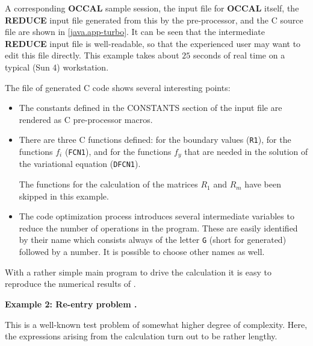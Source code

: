 \documentclass[12pt,a4paper]{article}
\newcommand{\OCCAL}{{\sf\bf OCCAL}}
\newcommand{\REDUCE}{{\sf\bf REDUCE}}
\newcommand{\C}{{\sf C}}
\begin{document}
A corresponding \OCCAL{} sample session, the input file for \OCCAL{}
itself, the \REDUCE{} input file generated from this by the
pre-processor, and the \C{} source file are shown in \ref{java.app-turbo}.
It can be seen that the intermediate \REDUCE{} input file is
well-readable, so that the experienced user may want to edit this file
directly. This example takes about $25$ seconds of real time on a
typical (Sun 4) workstation.

The file of generated \C{} code shows several interesting points:
\begin{itemize}
  \item The constants defined in the CONSTANTS section of the input
        file are rendered as \C{} pre-processor macros.

  \item There are three \C{} functions defined: for the boundary
        values (\verb|R1|), for the functions $f_{i}$ (\verb|FCN1|),
        and for the functions $f_{y}$ that are needed in the solution
        of the variational equation (\verb|DFCN1|).

        The functions for the calculation of the matrices $R_{1}$ and
        $R_{m}$ have been skipped in this example.
  \item The code optimization process introduces several intermediate
        variables to reduce the number of operations in the program.
        These are easily identified by their name which consists
        always of the letter \verb|G| (short for generated) followed
        by a number. It is possible to choose other names as well.
\end{itemize}

With a rather simple main program to drive the calculation it is easy
to reproduce the numerical results of \cite{Wulkow}.

\vspace*{3mm}

\noindent
{\bf Example 2: Re-entry problem \cite{SB}.}


This is a well-known test problem of somewhat higher degree of complexity.
Here, the expressions arising from the calculation turn out
to be rather lengthy.
\end{document}
